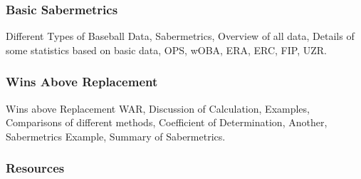 

\subsubsection{Basic Sabermetrics}\label{basic-sabermetrics}

Different Types of Baseball Data, Sabermetrics, Overview of all data,
Details of some statistics based on basic data, OPS, wOBA, ERA, ERC,
FIP, UZR.





\subsubsection{Wins Above Replacement}\label{wins-above-replacement}

Wins above Replacement WAR, Discussion of Calculation, Examples,
Comparisons of different methods, Coefficient of Determination, Another,
Sabermetrics Example, Summary of Sabermetrics.






\subsubsection{Resources}\label{resources}

